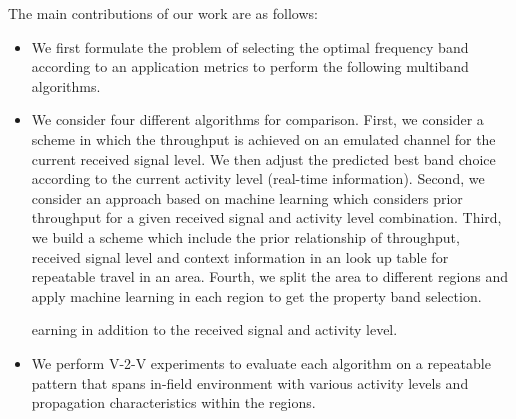 


The main contributions of our work are as follows:
\begin{itemize}
\item We first formulate the problem of selecting the optimal 
frequency band according to 
an application metrics
to perform the following multiband algorithms.
\item We consider four different algorithms for comparison.  First, we consider a scheme
in which the throughput is achieved on an emulated channel for
the current received signal level. We then adjust the predicted best band choice according to the current activity
level (real-time information). 
Second, we consider an approach based on machine learning which
considers prior throughput for a given received signal and activity level
combination.  
Third, we build a scheme which include the prior relationship of throughput, received signal level and context information in an look up table for repeatable travel in an area.
Fourth, we split the area to different regions and apply machine learning in each region to get the property band selection.

earning in addition to the received signal and activity level.
\item We perform V-2-V experiments to evaluate each algorithm on a repeatable pattern that
spans in-field environment with various activity
levels and propagation characteristics within the regions. 
\end{itemize}


